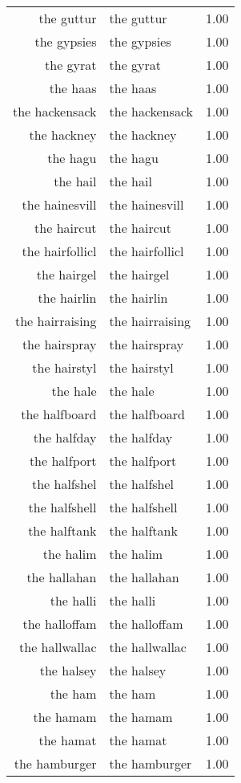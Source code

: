 \begin{table}[ht]
\begin{tabular}{rlr}
  the guttur & the guttur & 1.00 \\ 
  the gypsies & the gypsies & 1.00 \\ 
  the gyrat & the gyrat & 1.00 \\ 
  the haas & the haas & 1.00 \\ 
  the hackensack & the hackensack & 1.00 \\ 
  the hackney & the hackney & 1.00 \\ 
  the hagu & the hagu & 1.00 \\ 
  the hail & the hail & 1.00 \\ 
  the hainesvill & the hainesvill & 1.00 \\ 
  the haircut & the haircut & 1.00 \\ 
  the hairfollicl & the hairfollicl & 1.00 \\ 
  the hairgel & the hairgel & 1.00 \\ 
  the hairlin & the hairlin & 1.00 \\ 
  the hairraising & the hairraising & 1.00 \\ 
  the hairspray & the hairspray & 1.00 \\ 
  the hairstyl & the hairstyl & 1.00 \\ 
  the hale & the hale & 1.00 \\ 
  the halfboard & the halfboard & 1.00 \\ 
  the halfday & the halfday & 1.00 \\ 
  the halfport & the halfport & 1.00 \\ 
  the halfshel & the halfshel & 1.00 \\ 
  the halfshell & the halfshell & 1.00 \\ 
  the halftank & the halftank & 1.00 \\ 
  the halim & the halim & 1.00 \\ 
  the hallahan & the hallahan & 1.00 \\ 
  the halli & the halli & 1.00 \\ 
  the halloffam & the halloffam & 1.00 \\ 
  the hallwallac & the hallwallac & 1.00 \\ 
  the halsey & the halsey & 1.00 \\ 
  the ham & the ham & 1.00 \\ 
  the hamam & the hamam & 1.00 \\ 
  the hamat & the hamat & 1.00 \\ 
  the hamburger & the hamburger & 1.00 \\ 

\end{tabular}
\end{table}
